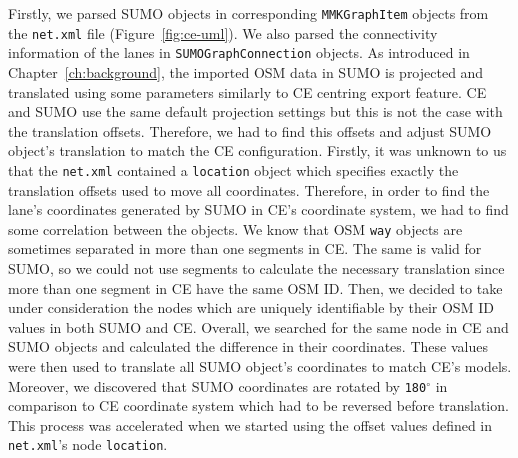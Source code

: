 Firstly, we parsed SUMO objects in corresponding \texttt{MMKGraphItem} objects from the \texttt{net.xml} file (Figure~\ref{fig:ce-uml}). We also parsed the connectivity information of the lanes in \texttt{SUMOGraphConnection} objects. As introduced in Chapter~\ref{ch:background}, the imported OSM data in SUMO is projected and translated using some parameters similarly to CE centring export feature. CE and SUMO use the same default projection settings but this is not the case with the translation offsets. Therefore, we had to find this offsets and adjust SUMO object's translation to match the CE configuration. Firstly, it was unknown to us that the \texttt{net.xml} contained a \texttt{location} object which specifies exactly the translation offsets used to move all coordinates. Therefore, in order to find the lane's coordinates generated by SUMO in CE's coordinate system, we had to find some correlation between the objects. We know that OSM \texttt{way} objects are sometimes separated in more than one segments in CE. The same is valid for SUMO, so we could not use segments to calculate the necessary translation since more than one segment in CE have the same OSM ID. Then, we decided to take under consideration the nodes which are uniquely identifiable by their OSM ID values in both SUMO and CE. Overall, we searched for the same node in CE and SUMO objects and calculated the difference in their coordinates. These values were then used to translate all SUMO object's coordinates to match CE's models. Moreover, we discovered that SUMO coordinates are rotated by \texttt{180$^{\circ}$} in comparison to CE coordinate system which had to be reversed before translation. This process was accelerated when we started using the offset values defined in \texttt{net.xml}'s node \texttt{location}.

